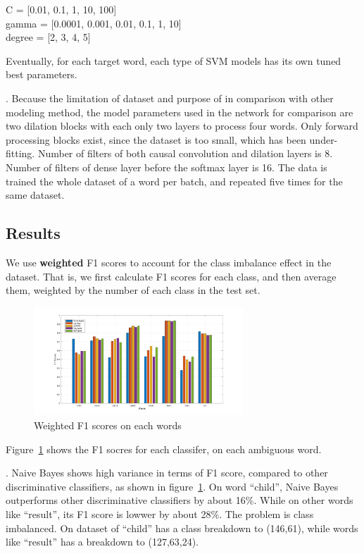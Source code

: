 C = [0.01, 0.1, 1, 10, 100] \\
gamma = [0.0001, 0.001, 0.01, 0.1, 1, 10] \\
degree = [2, 3, 4, 5]

Eventually, for each target word, each type of SVM models has its own tuned best
parameters.

.
Because the limitation of dataset and purpose of in comparison with other modeling method, the model parameters used in the network for comparison are two dilation blocks with each only two layers to process four words. Only forward processing blocks exist, since the dataset is too small, which has been under-fitting. Number of filters of both causal convolution and dilation layers is 8. Number of filters of dense layer before the softmax layer is 16. The data is trained the whole dataset of a word per batch, and repeated five times for the same dataset.

\subsection{Results}
\label{sec:eval:results}

We use \textbf{weighted} F1 scores to account for the class imbalance effect in
the dataset. 
That is, we first calculate F1 scores for each class, and then average them,
weighted by the number of each class in the test set.

\begin{figure}[h]
  \centering 
  \includegraphics[width=0.7\textwidth]{plots/f1.jpg}
    \caption{Weighted F1 scores on each words}
    \label{fig:results:f1}
\end{figure}

Figure~\ref{fig:results:f1} shows the F1 socres for each classifer,
on each ambiguous word.

.
Naive Bayes shows high variance in terms of F1 score, compared to other
discriminative classifiers, as shown in figure~\ref{fig:results:f1}.
On word ``child'', Naive Bayes outperforms other discriminative classifiers by
about 16\%.
While on other words like ``result'', its F1 score is lowwer by about 28\%.
The problem is class imbalanced. 
On dataset of ``child'' has a class breakdown to (146,61), while words like
``result'' has a breakdown to (127,63,24).
